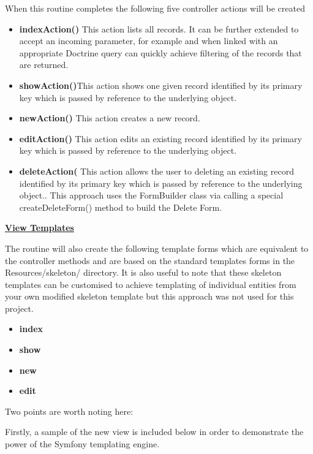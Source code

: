 \documentclass[a4paper,12pt]{article}
\begin{document}
When this routine completes the following five controller actions will be created
\begin {itemize}

\item \textbf{indexAction()} This action lists all records. It can be further extended to accept an incoming parameter, for example and when linked with an appropriate Doctrine query can quickly achieve filtering of the records that are returned.
\item \textbf{showAction()}This action shows one given record identified by its primary key which is passed by reference to the underlying object.
\item \textbf {newAction()} This action creates a new record.
\item \textbf{editAction()} This action edits an existing record identified by its primary key which is passed by reference to the underlying object.
\item \textbf{deleteAction(} This action allows the user to deleting an existing record identified by its primary key which is passed by reference to the underlying object.. This approach uses the FormBuilder class via calling a special createDeleteForm() method  to build the Delete Form.

\end {itemize}

\textbf {\underline{View Templates}}

The routine will also create the following template forms which are equivalent to the controller methods and are based on the standard templates forms in the Resources/skeleton/ directory. It is also useful to note that these skeleton templates can be customised to achieve templating of individual entities from your own modified skeleton template but this approach was not used for this project.
\begin {itemize}

\item \textbf{index} 
\item \textbf{show}
\item \textbf{new} 
\item \textbf{edit} 
\end {itemize}

Two points are worth noting here:

Firstly, a sample of the new view is included below in order to demonstrate the power of the Symfony templating engine.
\end{document}
